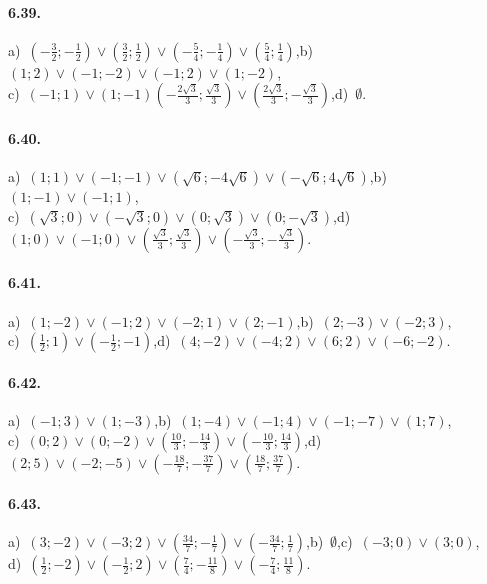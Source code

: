 \paragraph{6.39.} a)~$\left(-\frac 3 2;-\frac 1 2\right)\vee\left(\frac 3 2;\frac 1 2\right)\vee\left(-\frac 5 4;-\frac 1 4\right)\vee\left(\frac 5 4;\frac 1 4\right)$,\quad b)~$(1;2)\vee(-1;-2)\vee (-1;2)\vee (1;-2)$,\protect\\
\quad c)~$(-1;1)\vee (1;-1)\left(-\frac{2\sqrt 3} 3;\frac{\sqrt 3} 3\right)\vee\left(\frac{2\sqrt 3} 3;-\frac{\sqrt 3} 3\right)$,\quad d)~$\emptyset$.

\paragraph{6.40.} a)~$(1;1)\vee(-1;-1)\vee\left(\sqrt 6;-4\sqrt 6\right)\vee\left(-\sqrt 6;4\sqrt 6\right)$,\quad b)~$(1;-1)\vee(-1;1)$,\protect\\
\quad c)~$(\sqrt 3;0)\vee (-\sqrt 3;0)\vee (0;\sqrt 3)\vee (0;-\sqrt 3)$,\quad d)~$(1;0)\vee (-1;0)\vee\left(\frac{\sqrt 3} 3;\frac{\sqrt 3} 3\right)\vee\left(-\frac{\sqrt 3} 3;-\frac{\sqrt 3} 3\right)$.

\paragraph{6.41.} a)~$(1;-2)\vee(-1;2)\vee (-2;1)\vee (2;-1)$,\quad b)~$(2;-3)\vee(-2;3)$,\protect\\
\quad c)~$\left(\frac 1 2;1\right)\vee \left(-\frac 1 2;-1\right)$,\quad d)~$(4;-2)\vee(-4;2)\vee (6;2)\vee (-6;-2)$.

\paragraph{6.42.} a)~$(-1;3)\vee(1;-3)$,\quad b)~$(1;-4)\vee(-1;4)\vee (-1;-7)\vee (1;7)$,\protect\\
\quad c)~$(0;2)\vee (0;-2)\vee \left(\frac{10} 3;-\frac{14} 3\right)\vee \left(-\frac{10} 3;\frac{14} 3\right)$,\quad d)~$(2;5)\vee (-2;-5)\vee \left(-\frac{18} 7;-\frac{37} 7\right)\vee \left(\frac{18} 7;\frac{37} 7\right)$.

\paragraph{6.43.} a)~$(3;-2)\vee(-3;2)\vee\left(\frac{34} 7;-\frac 1 7\right)\vee \left(-\frac{34} 7;\frac 1 7\right)$,\quad b)~$\emptyset$,\quad c)~$(-3;0)\vee(3;0)$,\protect\\
\quad d)~$\left(\frac 1 2;-2\right)\vee\left(-\frac 1 2;2\right)\vee\left(\frac 7 4;-\frac{11} 8\right)\vee\left(-\frac 7 4;\frac{11} 8\right)$.

